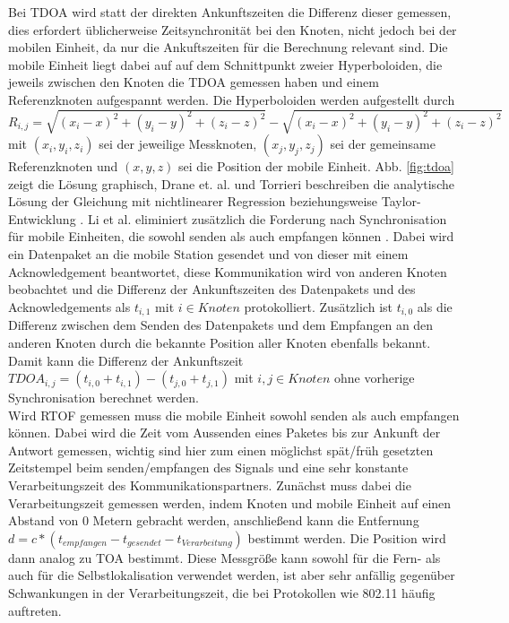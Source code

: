 Bei TDOA wird statt der direkten Ankunftszeiten die Differenz dieser gemessen, dies erfordert üblicherweise Zeitsynchronität bei den Knoten, nicht jedoch bei der mobilen Einheit, da nur die Ankuftszeiten für die Berechnung relevant sind. Die mobile Einheit liegt dabei auf auf dem Schnittpunkt zweier Hyperboloiden, die jeweils zwischen den Knoten die TDOA gemessen haben und einem Referenzknoten aufgespannt werden. 
Die Hyperboloiden werden aufgestellt durch \\
$R_{i,j} = \sqrt{(x_i - x)^2 + (y_i - y)^2 + (z_i - z)^2} - \sqrt{(x_i - x)^2 + (y_i - y)^2 + (z_i - z)^2}$ mit $(x_i,y_i,z_i)$ sei der jeweilige Messknoten, $(x_j,y_j,z_j)$ sei der gemeinsame Referenzknoten und $(x,y,z)$ sei die Position der mobile Einheit. Abb. \ref{fig:tdoa} zeigt die Lösung graphisch, Drane et. al. und Torrieri beschreiben die analytische Lösung der Gleichung mit nichtlinearer Regression \cite{drane1998positioning} beziehungsweise Taylor-Entwicklung \cite{torrieri1984statistical}. 
Li et al. eliminiert zusätzlich die Forderung nach Synchronisation für mobile Einheiten, die sowohl senden als auch empfangen können \cite{li2000comparison}. 
Dabei wird ein Datenpaket an die mobile Station gesendet und von dieser mit einem Acknowledgement beantwortet, diese Kommunikation wird von anderen Knoten beobachtet und die Differenz der Ankunftszeiten des Datenpakets und des Acknowledgements als $t_{i,1}$ mit $i \in Knoten$ protokolliert. Zusätzlich ist $t_{i,0}$ als die Differenz zwischen dem Senden des Datenpakets und dem Empfangen an den anderen Knoten durch die bekannte Position aller Knoten ebenfalls bekannt. Damit kann die Differenz der Ankunftszeit $TDOA_{i,j} = (t_{i,0} + t_{i,1}) - (t_{j,0} + t_{j,1})$ mit $i,j \in Knoten$ ohne vorherige Synchronisation berechnet werden. \\
Wird RTOF gemessen muss die mobile Einheit sowohl senden als auch empfangen können. Dabei wird die Zeit vom Aussenden eines Paketes bis zur Ankunft der Antwort gemessen, wichtig sind hier zum einen möglichst spät/früh gesetzten Zeitstempel beim senden/empfangen des Signals und eine sehr konstante Verarbeitungszeit des Kommunikationspartners. Zunächst muss dabei die Verarbeitungszeit gemessen werden, indem Knoten und mobile Einheit auf einen Abstand von 0 Metern gebracht werden, anschließend kann die Entfernung $d = c*(t_{empfangen} - t_{gesendet} - t_{Verarbeitung})$ bestimmt werden. Die Position wird dann analog zu TOA bestimmt. Diese Messgröße kann sowohl für die Fern- als auch für die Selbstlokalisation verwendet werden, ist aber sehr anfällig gegenüber Schwankungen in der Verarbeitungszeit, die bei Protokollen wie 802.11 häufig auftreten. \\
